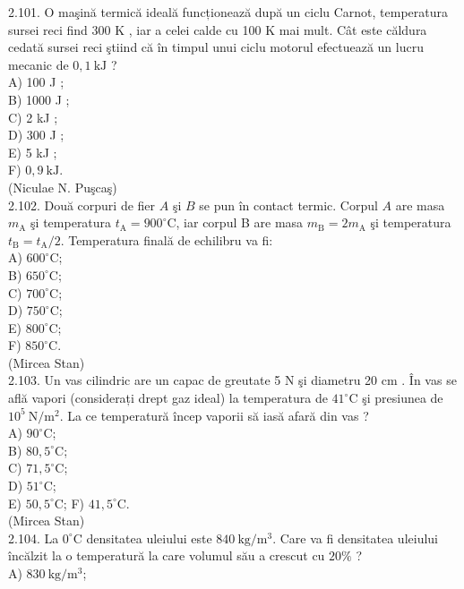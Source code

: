 \documentclass[10pt]{article}
\begin{document}
2.101. O maşină termică ideală funcționează după un ciclu Carnot, temperatura sursei reci find 300 K , iar a celei calde cu 100 K mai mult. Cât este căldura cedată sursei reci ştiind că în timpul unui ciclu motorul efectuează un lucru mecanic de $0,1 \mathrm{~kJ}$ ?\\
A) 100 J ;\\
B) 1000 J ;\\
C) 2 kJ ;\\
D) 300 J ;\\
E) 5 kJ ;\\
F) $0,9 \mathrm{~kJ}$.\\
(Niculae N. Puşcaş)\\
2.102. Două corpuri de fier $A$ şi $B$ se pun în contact termic. Corpul $A$ are masa $m_{\mathrm{A}}$ şi temperatura $t_{\mathrm{A}}=900^{\circ} \mathrm{C}$, iar corpul B are masa $m_{\mathrm{B}}=2 m_{\mathrm{A}}$ şi temperatura $t_{\mathrm{B}}=t_{\mathrm{A}} / 2$. Temperatura finală de echilibru va fi:\\
A) $600^{\circ} \mathrm{C}$;\\
B) $650^{\circ} \mathrm{C}$;\\
C) $700^{\circ} \mathrm{C}$;\\
D) $750^{\circ} \mathrm{C}$;\\
E) $800^{\circ} \mathrm{C}$;\\
F) $850^{\circ} \mathrm{C}$.\\
(Mircea Stan)\\
2.103. Un vas cilindric are un capac de greutate 5 N şi diametru 20 cm . În vas se află vapori (considerați drept gaz ideal) la temperatura de $41^{\circ} \mathrm{C}$ şi presiunea de $10^{5} \mathrm{~N} / \mathrm{m}^{2}$. La ce temperatură încep vaporii să iasă afară din vas ?\\
A) $90^{\circ} \mathrm{C}$;\\
B) $80,5^{\circ} \mathrm{C}$;\\
C) $71,5^{\circ} \mathrm{C}$;\\
D) $51^{\circ} \mathrm{C}$;\\
E) $50,5^{\circ} \mathrm{C}$; F) $41,5^{\circ} \mathrm{C}$.\\
(Mircea Stan)\\
2.104. La $0^{\circ} \mathrm{C}$ densitatea uleiului este $840 \mathrm{~kg} / \mathrm{m}^{3}$. Care va fi densitatea uleiului încălzit la o temperatură la care volumul său a crescut cu $20 \%$ ?\\
A) $830 \mathrm{~kg} / \mathrm{m}^{3}$;\\
\end{document}
